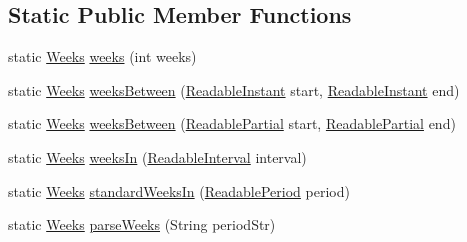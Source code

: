 \subsection*{Static Public Member Functions}
\begin{DoxyCompactItemize}
\item 
static \hyperlink{classorg_1_1joda_1_1time_1_1_weeks}{Weeks} \hyperlink{classorg_1_1joda_1_1time_1_1_weeks_a3400c36b657baaf1c64630ab8a8c5389}{weeks} (int weeks)
\item 
static \hyperlink{classorg_1_1joda_1_1time_1_1_weeks}{Weeks} \hyperlink{classorg_1_1joda_1_1time_1_1_weeks_a96b2f7605c0c09cef3999fc02d534293}{weeks\-Between} (\hyperlink{interfaceorg_1_1joda_1_1time_1_1_readable_instant}{Readable\-Instant} start, \hyperlink{interfaceorg_1_1joda_1_1time_1_1_readable_instant}{Readable\-Instant} end)
\item 
static \hyperlink{classorg_1_1joda_1_1time_1_1_weeks}{Weeks} \hyperlink{classorg_1_1joda_1_1time_1_1_weeks_af1c645c3f6fc7a1d0dcaae85d82878f2}{weeks\-Between} (\hyperlink{interfaceorg_1_1joda_1_1time_1_1_readable_partial}{Readable\-Partial} start, \hyperlink{interfaceorg_1_1joda_1_1time_1_1_readable_partial}{Readable\-Partial} end)
\item 
static \hyperlink{classorg_1_1joda_1_1time_1_1_weeks}{Weeks} \hyperlink{classorg_1_1joda_1_1time_1_1_weeks_af660dff5a3398de98f36a49c79eb90ba}{weeks\-In} (\hyperlink{interfaceorg_1_1joda_1_1time_1_1_readable_interval}{Readable\-Interval} interval)
\item 
static \hyperlink{classorg_1_1joda_1_1time_1_1_weeks}{Weeks} \hyperlink{classorg_1_1joda_1_1time_1_1_weeks_a8f1e0fc42f1f7fbd90b1b8fb9abcd1e1}{standard\-Weeks\-In} (\hyperlink{interfaceorg_1_1joda_1_1time_1_1_readable_period}{Readable\-Period} period)
\item 
static \hyperlink{classorg_1_1joda_1_1time_1_1_weeks}{Weeks} \hyperlink{classorg_1_1joda_1_1time_1_1_weeks_aa451cb8eb1dc61cb01acc2de2020f897}{parse\-Weeks} (String period\-Str)
\end{DoxyCompactItemize}

